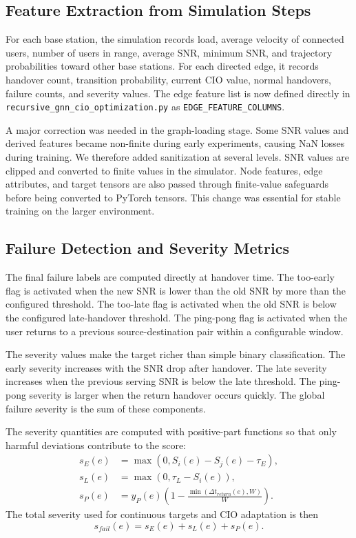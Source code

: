 \documentclass[11pt,a4paper]{article}
\begin{document}
\subsection{Feature Extraction from Simulation Steps}
For each base station, the simulation records load, average velocity of connected users, number of users in range, average SNR, minimum SNR, and trajectory probabilities toward other base stations. For each directed edge, it records handover count, transition probability, current CIO value, normal handovers, failure counts, and severity values. The edge feature list is now defined directly in \texttt{recursive\_gnn\_cio\_optimization.py} as \texttt{EDGE\_FEATURE\_COLUMNS}.

A major correction was needed in the graph-loading stage. Some SNR values and derived features became non-finite during early experiments, causing NaN losses during training. We therefore added sanitization at several levels. SNR values are clipped and converted to finite values in the simulator. Node features, edge attributes, and target tensors are also passed through finite-value safeguards before being converted to PyTorch tensors. This change was essential for stable training on the larger environment.

\subsection{Failure Detection and Severity Metrics}
The final failure labels are computed directly at handover time. The too-early flag is activated when the new SNR is lower than the old SNR by more than the configured threshold. The too-late flag is activated when the old SNR is below the configured late-handover threshold. The ping-pong flag is activated when the user returns to a previous source-destination pair within a configurable window.

The severity values make the target richer than simple binary classification. The early severity increases with the SNR drop after handover. The late severity increases when the previous serving SNR is below the late threshold. The ping-pong severity is larger when the return handover occurs quickly. The global failure severity is the sum of these components.

The severity quantities are computed with positive-part functions so that only harmful deviations contribute to the score:
\begin{align}
s_E(e)&=\max(0,S_i(e)-S_j(e)-\tau_E),\\
s_L(e)&=\max(0,\tau_L-S_i(e)),\\
s_P(e)&=y_P(e)\left(1-\frac{\min(\Delta t_{return}(e),W)}{W}\right).
\end{align}
The total severity used for continuous targets and CIO adaptation is then
\begin{equation}
s_{fail}(e)=s_E(e)+s_L(e)+s_P(e).
\end{equation}
\end{document}

